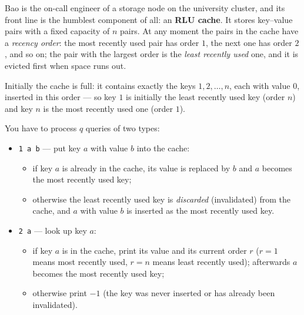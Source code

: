 Bao is the on-call engineer of a storage node on the university cluster, and its front line is the humblest component of all: an \textbf{RLU cache}. It stores key--value pairs with a fixed capacity of $n$ pairs. At any moment the pairs in the cache have a \emph{recency order}: the most recently used pair has order $1$, the next one has order $2$, and so on; the pair with the largest order is the \emph{least recently used} one, and it is evicted first when space runs out.

Initially the cache is full: it contains exactly the keys $1, 2, \ldots, n$, each with value $0$, inserted in this order --- so key $1$ is initially the least recently used key (order $n$) and key $n$ is the most recently used one (order $1$).

You have to process $q$ queries of two types:

\begin{itemize}
  \item \texttt{1 a b} --- put key $a$ with value $b$ into the cache:
    \begin{itemize}
      \item if key $a$ is already in the cache, its value is replaced by $b$ and $a$ becomes the most recently used key;
      \item otherwise the least recently used key is \emph{discarded} (invalidated) from the cache, and $a$ with value $b$ is inserted as the most recently used key.
    \end{itemize}
  \item \texttt{2 a} --- look up key $a$:
    \begin{itemize}
      \item if key $a$ is in the cache, print its value and its current order $r$ ($r = 1$ means most recently used, $r = n$ means least recently used); afterwards $a$ becomes the most recently used key;
      \item otherwise print $-1$ (the key was never inserted or has already been invalidated).
    \end{itemize}
\end{itemize}

